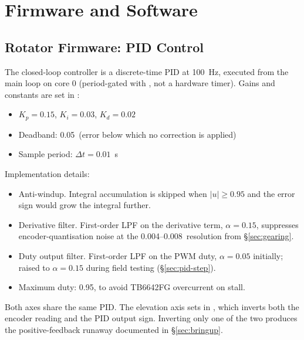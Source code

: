 \chapter{Firmware and Software}
\label{ch:firmware-software}

\section{Rotator Firmware: PID Control}
\label{sec:rotator-pid}

The closed-loop controller is a discrete-time PID at 100~Hz, executed from the main  loop on core 0 (period-gated with , not a hardware timer). Gains and constants are set in :

\begin{itemize}
    \item $K_p = 0.15$, $K_i = 0.03$, $K_d = 0.02$
    \item Deadband: 0.05\degree\ (error below which no correction is applied)
    \item Sample period: $\Delta t = 0.01$~s
\end{itemize}

Implementation details:

\begin{itemize}
    \item Anti-windup. Integral accumulation is skipped when $|u| \geq 0.95$ and the error sign would grow the integral further.
    \item Derivative filter. First-order LPF on the derivative term, $\alpha = 0.15$, suppresses encoder-quantisation noise at the 0.004\degree--0.008\degree\ resolution from \S\ref{sec:gearing}.
    \item Duty output filter. First-order LPF on the PWM duty, $\alpha = 0.05$ initially; raised to $\alpha = 0.15$ during field testing (\S\ref{sec:pid-step}).
    \item Maximum duty: 0.95, to avoid TB6642FG overcurrent on stall.
\end{itemize}

Both axes share the same PID. The elevation axis sets  in , which inverts both the encoder reading and the PID output sign. Inverting only one of the two produces the positive-feedback runaway documented in \S\ref{sec:bringup}.

